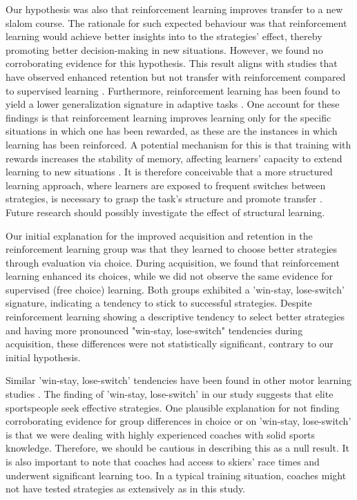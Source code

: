 \documentclass{article}
\begin{document}
Our hypothesis was also that reinforcement learning improves transfer to a new slalom course. The rationale for such expected behaviour was that reinforcement learning would achieve better insights into to the strategies' effect, thereby promoting better decision-making in new situations. However, we found no corroborating evidence for this hypothesis. This result aligns with studies that have observed enhanced retention but not transfer with reinforcement compared to supervised learning \cite{hasson_reinforcement_2015}. Furthermore, reinforcement learning has been found to yield a lower generalization signature in adaptive tasks \cite{lior_shmuelof_overcoming_2012}. One account for these findings is that reinforcement learning improves learning only for the specific situations in which one has been rewarded, as these are the instances in which learning has been reinforced. A potential mechanism for this is that training with rewards increases the stability of memory, affecting learners' capacity to extend learning to new situations \cite{robertson_memory_2018}. It is therefore conceivable that a more structured learning approach, where learners are exposed to frequent switches between strategies, is necessary to grasp the task's structure and promote transfer \cite{braun_structure_2010}. Future research should possibly investigate the effect of structural learning. 

Our initial explanation for the improved acquisition and retention in the reinforcement learning group was that they learned to choose better strategies through evaluation via choice. During acquisition, we found that reinforcement learning enhanced its choices, while we did not observe the same evidence for supervised (free choice) learning. Both groups exhibited a 'win-stay, lose-switch' signature, indicating a tendency to stick to successful strategies. Despite reinforcement learning showing a descriptive tendency to select better strategies and having more pronounced "win-stay, lose-switch" tendencies during acquisition, these differences were not statistically significant, contrary to our initial hypothesis. 

Similar 'win-stay, lose-switch' tendencies have been found in other motor learning studies \cite{taylor_flexible_2011}. The finding of 'win-stay, lose-switch' in our study suggests that elite sportspeople seek effective strategies. One plausible explanation for not finding corroborating evidence for group differences in choice or on 'win-stay, lose-switch' is that we were dealing with highly experienced coaches with solid sports knowledge. Therefore, we should be cautious in describing this as a null result. It is also important to note that coaches had access to skiers' race times and underwent significant learning too. In a typical training situation, coaches might not have tested strategies as extensively as in this study.  
\end{document}
